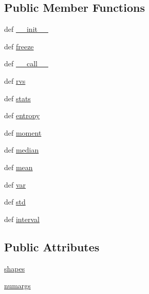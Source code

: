 \subsection*{Public Member Functions}
\begin{DoxyCompactItemize}
\item 
def \hyperlink{classscipy_1_1stats_1_1__distn__infrastructure_1_1rv__generic_a790b13828111eb4be5e45257ed50b8d1}{\+\_\+\+\_\+init\+\_\+\+\_\+}
\item 
def \hyperlink{classscipy_1_1stats_1_1__distn__infrastructure_1_1rv__generic_a70236ee56559d5f65c3bbf43d263d212}{freeze}
\item 
def \hyperlink{classscipy_1_1stats_1_1__distn__infrastructure_1_1rv__generic_a29a78d70f6a26b7cb98354eacf55caa1}{\+\_\+\+\_\+call\+\_\+\+\_\+}
\item 
def \hyperlink{classscipy_1_1stats_1_1__distn__infrastructure_1_1rv__generic_a1df7faa503a6b61f6c406e0544e6a271}{rvs}
\item 
def \hyperlink{classscipy_1_1stats_1_1__distn__infrastructure_1_1rv__generic_a7fb2965a3dce87de08673990cb6fd5f0}{stats}
\item 
def \hyperlink{classscipy_1_1stats_1_1__distn__infrastructure_1_1rv__generic_ad19d24092e1dc079e0c417a15ca815b8}{entropy}
\item 
def \hyperlink{classscipy_1_1stats_1_1__distn__infrastructure_1_1rv__generic_a480a174026c1568f849f5eeb84b46d34}{moment}
\item 
def \hyperlink{classscipy_1_1stats_1_1__distn__infrastructure_1_1rv__generic_a74bca38e60c210cb0f7f04dad95e9275}{median}
\item 
def \hyperlink{classscipy_1_1stats_1_1__distn__infrastructure_1_1rv__generic_a623a2736289af0dc2269963ae80df388}{mean}
\item 
def \hyperlink{classscipy_1_1stats_1_1__distn__infrastructure_1_1rv__generic_af5f47c64c73bb023d1253c80fb2245be}{var}
\item 
def \hyperlink{classscipy_1_1stats_1_1__distn__infrastructure_1_1rv__generic_a08901a0d2f8737b2e8201110e97b887b}{std}
\item 
def \hyperlink{classscipy_1_1stats_1_1__distn__infrastructure_1_1rv__generic_a71d454366807a57c01f15e77062d8272}{interval}
\end{DoxyCompactItemize}
\subsection*{Public Attributes}
\begin{DoxyCompactItemize}
\item 
\hyperlink{classscipy_1_1stats_1_1__distn__infrastructure_1_1rv__generic_a6dffc670248d521a82706cf81ac54996}{shapes}
\item 
\hyperlink{classscipy_1_1stats_1_1__distn__infrastructure_1_1rv__generic_ad727ed0100f91f82174a381d3ee58886}{numargs}
\end{DoxyCompactItemize}


